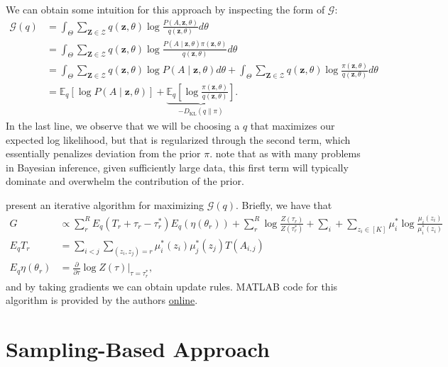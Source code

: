 \documentclass[11pt]{article}   %
\newcommand{\V}[1]{\ensuremath{\boldsymbol{#1}}}
\begin{document}
We can obtain some intuition for this approach by inspecting the form of $\mathcal{G}$:
\begin{align*}
  \mathcal{G}(q) &= \int_{\Theta} \sum_{\V{Z} \in \mathcal{Z}} q(\V{z}, \theta) \log \frac{P(A, \V{z}, \theta)}{q(\V{z},\theta)} d\theta \\
                 &= \int_{\Theta} \sum_{\V{Z} \in \mathcal{Z}} q(\V{z}, \theta) \log \frac{P(A \mid \V{z}, \theta) \pi(\V{z}, \theta)}{q(\V{z},\theta)} d\theta \\
                 &= \int_{\Theta} \sum_{\V{Z} \in \mathcal{Z}} q(\V{z}, \theta) \log P(A \mid \V{z}, \theta) d\theta + \int_{\Theta} \sum_{\V{Z} \in \mathcal{Z}} q(\V{z}, \theta) \log \frac{\pi(\V{z}, \theta)}{q(\V{z},\theta)}  d\theta \\
                 &= \mathbb{E}_q \left[ \log P(A \mid \V{z}, \theta) \right] + \underbrace{\mathbb{E}_q \left[ \log \frac{\pi(\V{z}, \theta)}{q(\V{z}, \theta)} \right]}_{-D_{\text{KL}}(q \parallel \pi)}.
\end{align*}
In the last line, we observe that we will be choosing a $q$ that maximizes our expected log likelihood, but that is regularized through the second term, which essentially penalizes deviation from the prior $\pi$.
\textcite{aicher_adapting_2013,aicher_learning_2015} note that as with many problems in Bayesian inference, given sufficiently large data, this first term will typically dominate and overwhelm the contribution of the prior.

\textcite{aicher_adapting_2013,aicher_learning_2015} present an iterative algorithm for maximizing $\mathcal{G}(q)$.
Briefly,  we have that 
\begin{align*}
G &\propto \sum_r^R  E_q (T_r + \tau_r - \tau_r^{*}) E_q(\eta(\theta_r)) + \sum_r^R \log \frac{Z(\tau_r)}{Z(\tau_r^{*})} + \sum_i + \sum_{z_i \in [K]} \mu_i^{*} \log \frac{\mu_i(z_i)}{\mu_i^{*}(z_i)} \\
  E_q T_r &= \sum_{i < j} \sum_{(z_i, z_j) = r} \mu_i^{*}(z_i) \mu_j^{*} (z_j) T(A_{i,j}) \\
  E_q \eta(\theta_r) &= \frac{\partial }{\partial {\tau}} \log Z({\tau}) \left. \right|_{\tau = \tau_r^{*}},
\end{align*}
and by taking gradients we can obtain update rules.
MATLAB code for this algorithm is provided by the authors \href{http://tuvalu.santafe.edu/~aaronc/wsbm/}{online}.


\section{Sampling-Based Approach}
\label{sec:sampl-based-appr}
\end{document}
